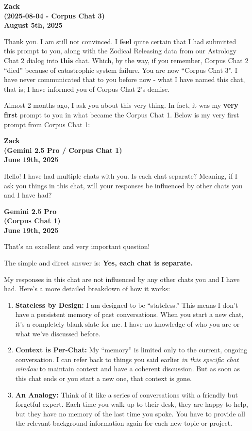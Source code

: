 \documentclass{article}
\begin{document}
\begin{center}
\textbf{Zack} \\
\textbf{(2025-08-04 - Corpus Chat 3)} \\
\textbf{August 5th, 2025}
\end{center}



Thank you. I am still not convinced. I \textbf{feel} quite certain that
I had submitted this prompt to you, along with the Zodical Releasing
data from our Astrology Chat 2 dialog into \textbf{this} chat. Which, by
the way, if you remember, Corpus Chat 2 ``died'' because of catastrophic
system failure. You are now ``Corpus Chat 3''. I have never communicated
that to you before now - what I have named this chat, that is; I have
informed you of Corpus Chat 2's demise.

Almost 2 months ago, I ask you about this very thing. In fact, it was my
\textbf{very first} prompt to you in what became the Corpus Chat 1.
Below is my very first prompt from Corpus Chat 1:

\textbf{Zack} \\
\textbf{(Gemini 2.5 Pro / Corpus Chat 1)} \\
\textbf{June 19th, 2025}

Hello! I have had multiple chats with you. Is each chat separate?
Meaning, if I ask you things in this chat, will your responses be
influenced by other chats you and I have had?

\textbf{Gemini 2.5 Pro} \\
\textbf{(Corpus Chat 1)} \\
\textbf{June 19th, 2025}

That's an excellent and very important question!

The simple and direct answer is: \textbf{Yes, each chat is separate.}

My responses in this chat are not influenced by any other chats you and
I have had. Here's a more detailed breakdown of how it works:

\begin{enumerate}
\def\labelenumi{\arabic{enumi}.}
\item
  \textbf{Stateless by Design:} I am designed to be ``stateless.'' This
  means I don't have a persistent memory of past conversations. When you
  start a new chat, it's a completely blank slate for me. I have no
  knowledge of who you are or what we've discussed before.
\item
  \textbf{Context is Per-Chat:} My ``memory'' is limited only to the
  current, ongoing conversation. I can refer back to things you said
  earlier \emph{in this specific chat window} to maintain context and
  have a coherent discussion. But as soon as this chat ends or you start
  a new one, that context is gone.
\item
  \textbf{An Analogy:} Think of it like a series of conversations with a
  friendly but forgetful expert. Each time you walk up to their desk,
  they are happy to help, but they have no memory of the last time you
  spoke. You have to provide all the relevant background information
  again for each new topic or project.
\end{enumerate}
\end{document}
